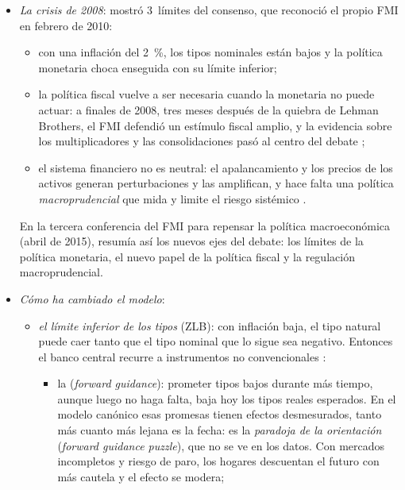 \documentclass[11pt]{article}
\begin{document}
\begin{itemize}
\item \emph{La crisis de 2008}: mostró 3~límites del consenso, que reconoció el propio FMI en febrero de 2010\nocite{BlanchardDellAricciaMauro2010}:
  \begin{itemize}
  \item con una inflación del 2~\%, los tipos nominales están bajos y la política monetaria choca enseguida con su límite inferior;
  \item la política fiscal vuelve a ser necesaria cuando la monetaria no puede actuar: a finales de 2008, tres meses después de la quiebra de Lehman Brothers, el FMI defendió un estímulo fiscal amplio\nocite{SpilimbergoEtAl2008Fiscal}, y la evidencia sobre los multiplicadores y las consolidaciones\nocite{RomerRomer2010Tax,Perotti2011Austerity} pasó al centro del debate ;
  \item el sistema financiero no es neutral: el apalancamiento y los precios de los activos generan perturbaciones y las amplifican, y hace falta una política \emph{macroprudencial} que mida y limite el riesgo sistémico .
  \end{itemize}
  En la tercera conferencia del FMI para repensar la política macroeconómica (abril de 2015),  resumía así los nuevos ejes del debate: los límites de la política monetaria, el nuevo papel de la política fiscal y la regulación macroprudencial\nocite{BlanchardEtAl2016Progress}.
\item \emph{Cómo ha cambiado el modelo}:
  \begin{itemize}
  \item \emph{el límite inferior de los tipos} (ZLB): con inflación baja, el tipo natural puede caer tanto que el tipo nominal que lo sigue sea negativo. Entonces el banco central recurre a instrumentos no convencionales :
    \begin{itemize}
    \item la  (\emph{forward guidance}): prometer tipos bajos durante más tiempo, aunque luego no haga falta, baja hoy los tipos reales esperados\nocite{EggertssonWoodford2003Zero}. En el modelo canónico esas promesas tienen efectos desmesurados, tanto más cuanto más lejana es la fecha: es la \emph{paradoja de la orientación} (\emph{forward guidance puzzle}), que no se ve en los datos\nocite{DelNegroGiannoniPatterson2023}. Con mercados incompletos y riesgo de paro, los hogares descuentan el futuro con más cautela y el efecto se modera\nocite{McKayNakamuraSteinsson2016};

\end{itemize}
\end{itemize}
\end{itemize}
\end{document}
